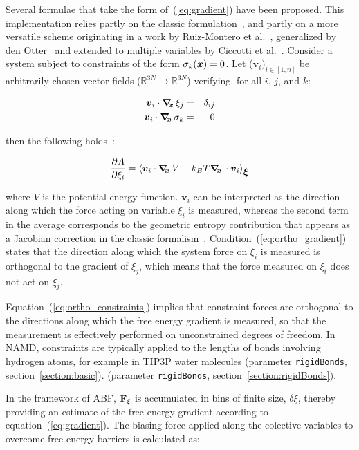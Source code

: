 Several formulae that take the form of~(\ref{eq:gradient}) have been
proposed.  This implementation relies partly on the classic
formulation~\cite{Carter1989}, and partly on a more versatile scheme
originating in a work by Ruiz-Montero et al.~\cite{Ruiz-Montero1997},
generalized by den Otter~\cite{denOtter2000} and extended to multiple
variables by Ciccotti et al.~\cite{Ciccotti2005}.  Consider a system
subject to constraints of the form $\sigma_{k}({\mbox{\boldmath{$x$}}}) = 0$.  Let
($\bm{v}_{i})_{i\in[1,n]}$ be arbitrarily chosen vector fields
($\mathbb{R}^{3N}\rightarrow\mathbb{R}^{3N}$) verifying, for all $i$,
$j$, and $k$:

\begin{eqnarray}
\label{eq:ortho_gradient}
{\mbox{\boldmath{$v$}}}_{i} \cdot \mbox{\boldmath$\nabla_{\!\!x}\,$} \xi_{j}    & = & \delta_{ij}\\
\label{eq:ortho_constraints}
{\mbox{\boldmath{$v$}}}_{i} \cdot \mbox{\boldmath$\nabla_{\!\!x}\,$} \sigma_{k} & = & 0
\end{eqnarray}

then the following holds~\cite{Ciccotti2005}:

\begin{equation}
\label{eq:gradient_vector}
\frac{\partial A}{\partial \xi_{i}} = \left\langle {\mbox{\boldmath{$v$}}}_{i} \cdot \mbox{\boldmath$\nabla_{\!\!x}\,$} V
- k_B T \mbox{\boldmath$\nabla_{\!\!x}\,$} \cdot {\mbox{\boldmath{$v$}}}_{i} \right\rangle_{\mbox{\boldmath{$\xi$}}}
\end{equation}

where $V$ is the potential energy function.
$\bm{v}_{i}$ can be interpreted as the direction along which the force
acting on variable $\xi_{i}$ is measured, whereas the second term in the
average corresponds to the geometric entropy contribution that appears
as a Jacobian correction in the classic formalism~\cite{Carter1989}.
Condition~(\ref{eq:ortho_gradient}) states that the direction along
which the system force on $\xi_{i}$ is measured is orthogonal to the
gradient of $\xi_{j}$, which means that the force measured on $\xi_{i}$
does not act on $\xi_{j}$.

Equation~(\ref{eq:ortho_constraints}) implies that constraint forces
are orthogonal to the directions along which the free energy gradient is
measured, so that the measurement is effectively performed on unconstrained
degrees of freedom. In NAMD, constraints are typically applied to the lengths of
bonds involving hydrogen atoms, for example in TIP3P water molecules
(parameter \texttt{rigidBonds}, section~\ref{section:basic}).
(parameter \texttt{rigidBonds}, section~\ref{section:rigidBonds}).


In the framework of ABF,
${\bf F}_\xi$ is accumulated in bins of finite size, $\delta \xi$,
thereby providing an estimate of the free energy gradient
according to equation~({\ref{eq:gradient}}).
The biasing force applied along the colective variables
to overcome free energy barriers is calculated as:

